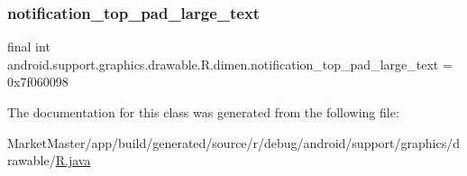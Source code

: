 \mbox{\label{classandroid_1_1support_1_1graphics_1_1drawable_1_1R_1_1dimen_a13b91dd416c56f3d0671a35a8cde2614}} 
\subsubsection{\texorpdfstring{notification\+\_\+top\+\_\+pad\+\_\+large\+\_\+text}{notification\_top\_pad\_large\_text}}
{\footnotesize\ttfamily final int android.\+support.\+graphics.\+drawable.\+R.\+dimen.\+notification\+\_\+top\+\_\+pad\+\_\+large\+\_\+text = 0x7f060098\hspace{0.3cm}{\ttfamily [static]}}



The documentation for this class was generated from the following file\+:\begin{DoxyCompactItemize}
\item 
Market\+Master/app/build/generated/source/r/debug/android/support/graphics/drawable/\mbox{\hyperlink{debug_2android_2support_2graphics_2drawable_2R_8java}{R.\+java}}\end{DoxyCompactItemize}
